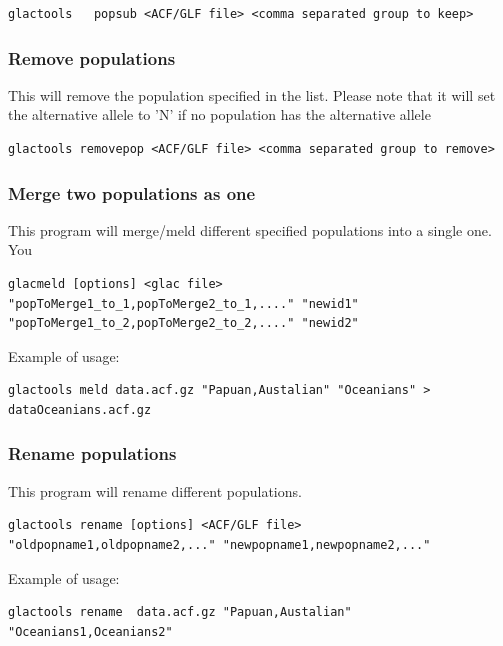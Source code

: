 \documentclass[a4paper]{article}
\begin{document}
\begin{lstlisting}
glactools   popsub <ACF/GLF file> <comma separated group to keep>
\end{lstlisting}

\subsubsection{Remove populations}

\noindent This will remove the population specified in the list. Please note that it will set the alternative allele to 'N' if no population has the alternative allele

\begin{lstlisting}
glactools removepop <ACF/GLF file> <comma separated group to remove>
\end{lstlisting}



\subsubsection{Merge two populations as one}

\noindent This program will merge/meld different specified populations into a single one. You 

\small
\begin{lstlisting}
glacmeld [options] <glac file> "popToMerge1_to_1,popToMerge2_to_1,...." "newid1" "popToMerge1_to_2,popToMerge2_to_2,...." "newid2"
\end{lstlisting}
\normalsize

Example of usage:
\small
\begin{lstlisting}
glactools meld data.acf.gz "Papuan,Austalian" "Oceanians" > dataOceanians.acf.gz
\end{lstlisting}
\normalsize

\subsubsection{Rename populations}

\noindent This program will rename different populations.

\small
\begin{lstlisting}
glactools rename [options] <ACF/GLF file> "oldpopname1,oldpopname2,..." "newpopname1,newpopname2,..."  
\end{lstlisting}
\normalsize

Example of usage:
\begin{lstlisting}
glactools rename  data.acf.gz "Papuan,Austalian" "Oceanians1,Oceanians2"
\end{lstlisting}
\end{document}
